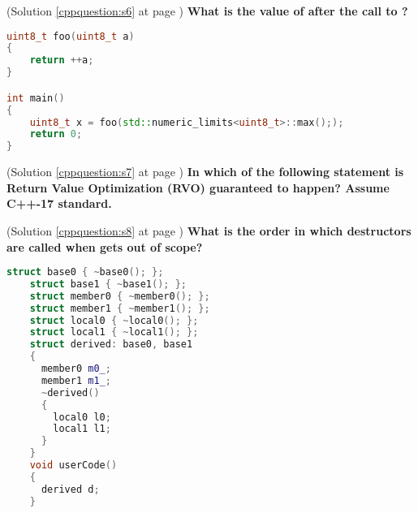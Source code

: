 \begin{cppquestion}
    \label{cppquestion:q6}
    (Solution \ref{cppquestion:s6} at page \pageref{cppquestion:s6})
    \question \textbf{What is the value of  after the call to ?} 
\begin{lstlisting}[language=c++,numbers=none, caption={}]
uint8_t foo(uint8_t a)
{
    return ++a;
}

int main()
{
    uint8_t x = foo(std::numeric_limits<uint8_t>::max(););
    return 0;
}
\end{lstlisting}
    \begin{choices}
     \choice {}
     \choice {}
     \choice {}
     \choice {}
     \choice {}
     \choice {}
     \choice {}
     \choice {}
     \choice {}
    \end{choices}
\end{cppquestion}



\begin{cppquestion}
    \label{cppquestion:q6}
    (Solution \ref{cppquestion:s7} at page \pageref{cppquestion:s7})
    \question \textbf{In which of the following statement is Return Value Optimization (RVO) guaranteed to happen? Assume C++-17 standard.} 
    \begin{choices}
     \choice {}
     \choice {}
     \choice {}
     \choice {}
    \end{choices}
\end{cppquestion}



\begin{cppquestion}
    \label{cppquestion:q8}
    (Solution \ref{cppquestion:s8} at page \pageref{cppquestion:s8})
    \question \textbf{What is the order in which destructors are called when  gets out of scope?} 
\begin{lstlisting}[language=c++,numbers=none, caption={}]
    struct base0 { ~base0(); };
    struct base1 { ~base1(); };
    struct member0 { ~member0(); };
    struct member1 { ~member1(); };
    struct local0 { ~local0(); };
    struct local1 { ~local1(); };
    struct derived: base0, base1
    {
      member0 m0_;
      member1 m1_;
      ~derived()
      {
        local0 l0;
        local1 l1;
      }
    }
    void userCode()
    {
      derived d;
    }                 
\end{lstlisting} 
\end{cppquestion}

















